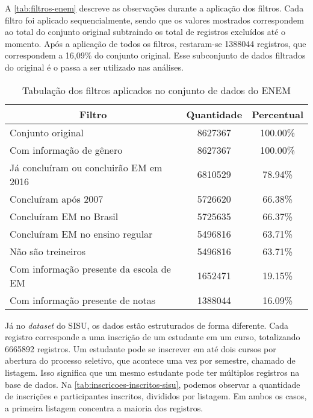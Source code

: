 A \autoref{tab:filtros-enem} descreve as observações durante a aplicação dos filtros. Cada filtro foi aplicado sequencialmente, sendo que os valores mostrados correspondem ao total do conjunto original subtraindo os total de registros excluídos até o momento. Após a aplicação de todos os filtros, restaram-se 1388044 registros, que correspondem a 16,09\% do conjunto original. Esse subconjunto de dados filtrados do original é o passa a ser utilizado nas análises.

\begin{table}[h]
  \begin{tabular}{lcc}
  \hline
  \multicolumn{1}{c}{\textbf{Filtro}}     & \textbf{Quantidade} & \textbf{Percentual} \\ \hline
  Conjunto original                       & 8627367             & 100.00\%            \\ \hline
  Com informação de gênero                & 8627367             & 100.00\%            \\ \hline
  Já concluíram ou concluirão EM em 2016  & 6810529             & 78.94\%             \\ \hline
  Concluíram após 2007                    & 5726620             & 66.38\%             \\ \hline
  Concluíram EM no Brasil                 & 5725635             & 66.37\%             \\ \hline
  Concluíram EM no ensino regular         & 5496816             & 63.71\%             \\ \hline
  Não são treineiros                      & 5496816             & 63.71\%             \\ \hline
  Com informação presente da escola de EM & 1652471             & 19.15\%             \\ \hline
  Com informação presente de notas        & 1388044             & 16.09\%             \\ \hline
  \end{tabular}
  \caption{Tabulação dos filtros aplicados no conjunto de dados do ENEM}
  \label{tab:filtros-enem}
  \end{table}

Já no \textit{dataset} do SISU, os dados estão estruturados de forma diferente. Cada registro corresponde a uma inscrição de um estudante em um curso, totalizando 6665892 registros. Um estudante pode se inscrever em até dois cursos por abertura do processo seletivo, que acontece uma vez por semestre, chamado de listagem. Isso significa que um mesmo estudante pode ter múltiplos registros na base de dados. Na \autoref{tab:inscricoes-inscritos-sisu}, podemos observar a quantidade de inscrições e participantes inscritos, divididos por listagem. Em ambos os casos, a primeira listagem concentra a maioria dos registros.


